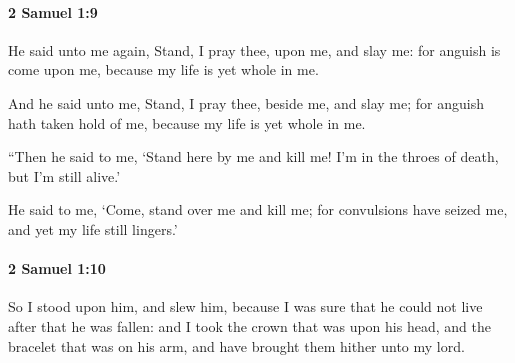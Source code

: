 		\paragraph{2 Samuel 1:9} %
			\label{2SAMUEL-1-9}

			He said unto me again, Stand, I pray thee, upon me, and slay me: for anguish is come upon me, because my life is yet whole in me.

			\begin{versebox}
					\item[BHS] 
					\item[ASV] And he said unto me, Stand, I pray thee, beside me, and slay me; for anguish hath taken hold of me, because my life is yet whole in me.
					\item[NIV] “Then he said to me, ‘Stand here by me and kill me! I’m in the throes of death, but I’m still alive.’
					\item[NRSV] He said to me, ‘Come, stand over me and kill me; for convulsions have seized me, and yet my life still lingers.’
			\end{versebox}

		\paragraph{2 Samuel 1:10} %
			\label{2SAMUEL-1-10}

			So I stood upon him, and slew him, because I was sure that he could not live after that he was fallen: and I took the crown that was upon his head, and the bracelet that was on his arm, and have brought them hither unto my lord.

